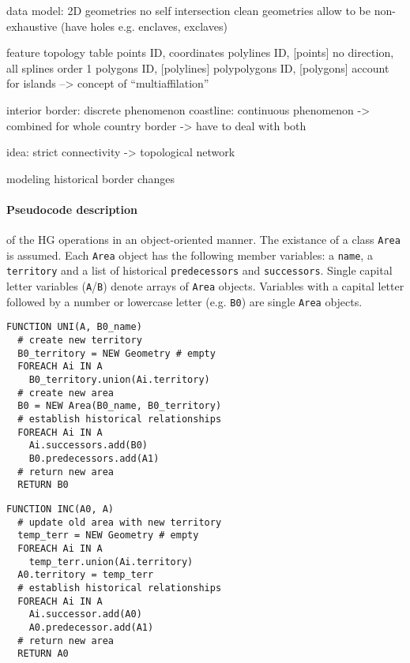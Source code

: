 data model:
2D geometries
no self intersection
clean geometries
allow to be non-exhaustive (have holes e.g. enclaves, exclaves)

feature topology table
points          ID, coordinates
polylines       ID, [points]        no direction, all splines order 1
polygons        ID, [polylines]
polypolygons    ID, [polygons]      account for islands
--> concept of ``multiaffilation''

interior border: discrete phenomenon
coastline: continuous phenomenon
-> combined for whole country border
-> have to deal with both

idea: strict connectivity -> topological network

modeling historical border changes


\paragraph{Pseudocode description} %
\label{par:pseudocode_description}

of the HG operations in an object-oriented manner. The existance of a class \texttt{Area} is assumed. Each \texttt{Area} object has the following member variables: a \texttt{name}, a \texttt{territory} and a list of historical \texttt{predecessors} and \texttt{successors}. Single capital letter variables (\texttt{A}/\texttt{B}) denote arrays of \texttt{Area} objects. Variables with a capital letter followed by a number or lowercase letter (e.g. \texttt{B0}) are single \texttt{Area} objects.

\begin{minipage}[t]{0.47\textwidth}
\begin{lstlisting}[language=pseudocode,
  caption=Unification]
FUNCTION UNI(A, B0_name)
  # create new territory
  B0_territory = NEW Geometry # empty
  FOREACH Ai IN A
    B0_territory.union(Ai.territory)
  # create new area
  B0 = NEW Area(B0_name, B0_territory)
  # establish historical relationships
  FOREACH Ai IN A
    Ai.successors.add(B0)
    B0.predecessors.add(A1)
  # return new area
  RETURN B0
\end{lstlisting}
\end{minipage}    %
\hspace{3.0em}    %
\begin{minipage}[t]{0.47\textwidth}
\begin{lstlisting}[language=pseudocode,
  caption=Incorporation]
FUNCTION INC(A0, A)
  # update old area with new territory
  temp_terr = NEW Geometry # empty
  FOREACH Ai IN A
    temp_terr.union(Ai.territory)
  A0.territory = temp_terr
  # establish historical relationships
  FOREACH Ai IN A
    Ai.successor.add(A0)
    A0.predecessor.add(A1)
  # return new area
  RETURN A0
\end{lstlisting}
\end{minipage}

